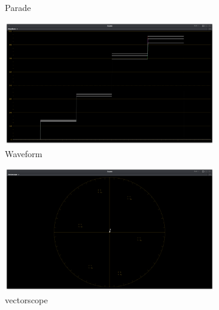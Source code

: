 \begin{figure}[ht!]
\begin{subfigure}[b]{0.475\textwidth}
            \caption[Parade]%
            {{\small Parade}}    
            \label{fig:parade-p3dci}
        \end{subfigure}
        \quad
        \begin{subfigure}[b]{0.475\textwidth}   
            \centering 
            \includegraphics[width=\textwidth]{images/p3dci/p3dci_waveform}
            \caption[]%
            {{\small Waveform}}    
            \label{fig:wf-p3dci}
        \end{subfigure}
        \begin{subfigure}[b]{0.475\textwidth}   
            \centering 
            \includegraphics[width=\textwidth]{images/p3dci/p3dci_vectorscope}
            \caption[]%
            {{\small vectorscope}}    
            \label{fig:vect-p3dci}
        \end{subfigure}
        \quad
        \begin{subfigure}[b]{0.475\textwidth}   
            \centering 

\end{subfigure}
\end{figure}
